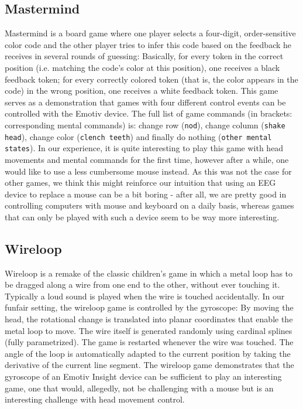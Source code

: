 \documentclass{utue} %
\begin{document}
\subsection{Mastermind}
Mastermind is a board game where one player selects a four-digit, order-sensitive color code and the other player tries to infer this code based on the feedback he receives in several rounds of guessing: Basically, for every token in the correct position (i.e. matching the code's color at this position), one receives a black feedback token; for every correctly colored token (that is, the color appears in the code) in the wrong position, one receives a white feedback token. This game serves as a demonstration that games with four different control events can be controlled with the Emotiv device. The full list of game commands (in brackets: corresponding mental commands) is: change row (\texttt{nod}), change column (\texttt{shake head}), change color (\texttt{clench teeth}) and finally do nothing (\texttt{other mental states}). In our experience, it is quite interesting to play this game with head movements and mental commands for the first time, however after a while, one would like to use a less cumbersome mouse instead. As this was not the case for other games, we think this might reinforce our intuition that using an EEG device to replace a mouse can be a bit boring - after all, we are pretty good in controlling computers with mouse and keyboard on a daily basis, whereas games that can only be played with such a device seem to be way more interesting.


\subsection{Wireloop}
Wireloop is a remake of the classic children's game in which a metal loop has to be dragged along a wire from one end to the other, without ever touching it. Typically a loud sound is played when the wire is touched accidentally. In our funfair setting, the wireloop game is controlled by the gyroscope: By moving the head, the rotational change is translated into planar coordinates that enable the metal loop to move. The wire itself is generated randomly using cardinal splines (fully parametrized). The game is restarted whenever the wire was touched. The angle of the loop is automatically adapted to the current position by taking the derivative of the current line segment.
The wireloop game demonstrates that the gyroscope of an Emotiv Insight device can be sufficient to play an interesting game, one that would, allegedly, not be challenging with a mouse but is an interesting challenge with head movement control.
\end{document}
